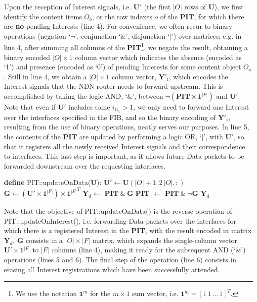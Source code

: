 Upon the reception of Interest signals, i.e. $\textbf{U}'$ (the first $|O|$ rows 
of $\textbf{U}$), we first identify the content items $O_o$, or the row indexes $o$ of the 
\textbf{PIT}, for which there are \textbf{no} pending Interests (line 4). For 
convenience, we often recur to binary operations (negation `$\neg$', 
conjunction `$\&$', disjunction `$|$') over matrices: e.g. in line 4, after 
summing all columns of the \textbf{PIT}\footnote{We use the notation $\textbf{1}^{m}$ for the $m \times 1$
sum vector, i.e. $\textbf{1}^{m} = [1\,1\,...\,1]^{T}$.}, we negate the 
result, obtaining a binary encoded $|O| \times 1$ 
column vector which indicates the absence (encoded as  `1') and presence 
(encoded as `0') of pending Interests for some content object $O_o$. Still in 
line 4, we obtain a $|O| \times 1$ column vector, $\textbf{Y}'_i$, which encodes the 
Interest signals that the NDN router needs to forward upstream. This is 
accomplished by taking the logic AND, `$\&$', between $\neg(\textbf{PIT} \times \textbf{1}^{|F|})$ and 
$\textbf{U}'$. Note that even 
if $\textbf{U}'$ includes some $i_{O_o} > 1$, we only need to forward one Interest 
over the interfaces specified in the FIB, and so the binary encoding of $\textbf{Y}'_i$, 
resulting from the use of binary operations, neatly serves our purposes. 
In line 5, the 
contents of the \textbf{PIT} are updated by performing a logic OR, `$|$', with $\textbf{U}'$, so 
that it registers all the newly received 
Interest signals and their correspondence to interfaces. This last step is important, 
as it allows future Data packets to be forwarded downstream over the requesting 
interfaces.\shortvertbreak

\begin{algorithmic}[1]

\State \textbf{define} PIT::updateOnData($\textbf{U}$):
\State
    \State $\textbf{U}' \leftarrow \textbf{U}(|O|+1:2\,|O|,:)$
    \State $\textbf{G} \leftarrow (\textbf{U}' \times \textbf{1}^{|F|}) \times {\textbf{1}^{|F|}}^{T}$
    \State $\textbf{Y}_d \leftarrow$ $\textbf{PIT} \ \& \ \textbf{G}$
    \State \textbf{PIT} $\leftarrow$ $\textbf{PIT} \ \& \ \neg\textbf{G}$ 
    \State \Return $\textbf{Y}_d$

\end{algorithmic}\shortvertbreak

Note that 
the objective of PIT::updateOnData() is the reverse operation of PIT::updateOnInterest(), i.e. forwarding Data 
packets over the interfaces for which there is a registered Interest in the \textbf{PIT}, with 
the result encoded in matrix $\textbf{Y}_d$. $\textbf{G}$ consists in a $|O| \times |F|$ matrix, which expands the single-column 
vector $\textbf{U}' \times \textbf{1}^{|F|}$ to $|F|$ columns (line 4), making it ready 
for the subsequent AND (`\&') operations (lines 5 and 6). The final 
step of the operation (line 6) consists in erasing 
all Interest registrations which have been successfully attended.\shortvertbreak

